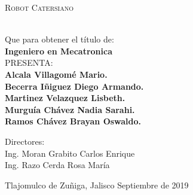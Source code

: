 \documentclass[letter,operight,12pt,spanish]{report}
\begin{document}
%
%
%
%
%
%
%
%
%
%
%
%
%
%
%
\begin{minipage}[l][0.78\textheight][t]{0.1\textwidth}
    \begin{center}
    \hskip0pt
    \vrule width2.5pt height17cm    %
        \hskip1mm
        \vrule width1pt height17cm  %
        \end{center}
\end{minipage}
\begin{minipage}[c][0.78\textheight][t]{0.8\textwidth}
      \begin{center}
      \vspace{2cm}
        {\Large \scshape {Robot Catersiano}}

        \vspace{2cm}

          \\[20pt]
        Que para obtener el t\'itulo de:\\[5pt]
        {\Large \textbf{{Ingeniero en Mecatronica}}}\\[40pt]
        PRESENTA:\\[12pt]
        \textbf{ \Large {Alcala Villagom\'e Mario.\\
        				Becerra I\~niguez Diego Armando.\\
        				Martinez Velazquez Lisbeth.\\
        				Murgu\'ia Ch\'avez Nadia Sarahi.\\
        				Ramos Ch\'avez Brayan Oswaldo.}}

        \vspace{2cm}

        { \small Directores}:\\ {Ing. Moran Grabito Carlos Enrique}\\{Ing. Razo Cerda Rosa Mar\'ia}
        \vspace{2.5cm}

        { Tlajomulco de Zuñiga, Jalisco} \hskip2.5cm {Septiembre de 2019}
      \end{center}
\end{minipage}
\end{document}
